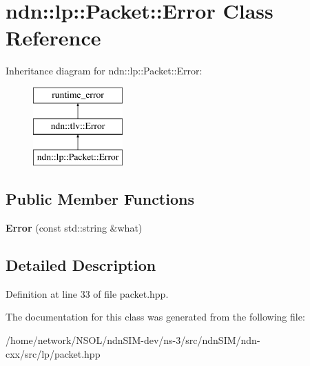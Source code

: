 \hypertarget{classndn_1_1lp_1_1Packet_1_1Error}{}\section{ndn\+:\+:lp\+:\+:Packet\+:\+:Error Class Reference}
\label{classndn_1_1lp_1_1Packet_1_1Error}
Inheritance diagram for ndn\+:\+:lp\+:\+:Packet\+:\+:Error\+:\begin{figure}[H]
\begin{center}
\leavevmode
\includegraphics[height=3.000000cm]{classndn_1_1lp_1_1Packet_1_1Error}
\end{center}
\end{figure}
\subsection*{Public Member Functions}
\begin{DoxyCompactItemize}
\item 
{\bfseries Error} (const std\+::string \&what)\hypertarget{classndn_1_1lp_1_1Packet_1_1Error_a16183746e3e94cbf5b42d75c67b21fb0}{}\label{classndn_1_1lp_1_1Packet_1_1Error_a16183746e3e94cbf5b42d75c67b21fb0}

\end{DoxyCompactItemize}


\subsection{Detailed Description}


Definition at line 33 of file packet.\+hpp.



The documentation for this class was generated from the following file\+:\begin{DoxyCompactItemize}
\item 
/home/network/\+N\+S\+O\+L/ndn\+S\+I\+M-\/dev/ns-\/3/src/ndn\+S\+I\+M/ndn-\/cxx/src/lp/packet.\+hpp\end{DoxyCompactItemize}
